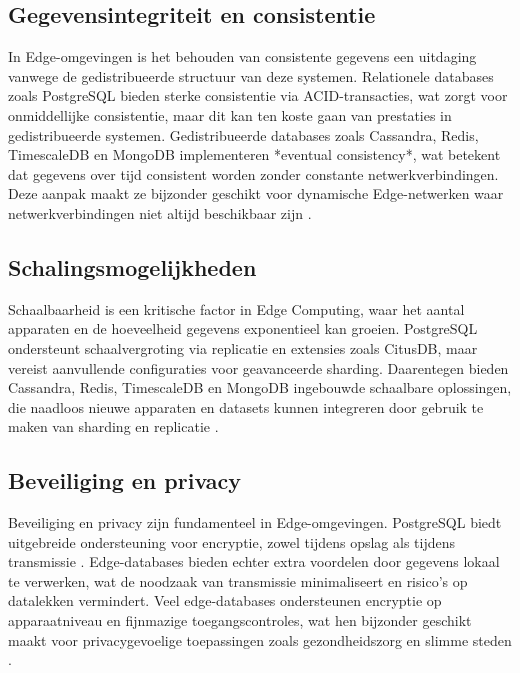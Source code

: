 \subsection{Gegevensintegriteit en consistentie}

In Edge-omgevingen is het behouden van consistente gegevens een uitdaging vanwege de gedistribueerde structuur van deze systemen. Relationele databases zoals PostgreSQL bieden sterke consistentie via ACID-transacties, wat zorgt voor onmiddellijke consistentie, maar dit kan ten koste gaan van prestaties in gedistribueerde systemen. Gedistribueerde databases zoals Cassandra, Redis, TimescaleDB en MongoDB implementeren *eventual consistency*, wat betekent dat gegevens over tijd consistent worden zonder constante netwerkverbindingen. Deze aanpak maakt ze bijzonder geschikt voor dynamische Edge-netwerken waar netwerkverbindingen niet altijd beschikbaar zijn \autocite{Taheri2020, Kleppmann2017, CassandraDocumentation}.

\subsection{Schalingsmogelijkheden}

Schaalbaarheid is een kritische factor in Edge Computing, waar het aantal apparaten en de hoeveelheid gegevens exponentieel kan groeien. PostgreSQL ondersteunt schaalvergroting via replicatie en extensies zoals CitusDB, maar vereist aanvullende configuraties voor geavanceerde sharding. Daarentegen bieden Cassandra, Redis, TimescaleDB en MongoDB ingebouwde schaalbare oplossingen, die naadloos nieuwe apparaten en datasets kunnen integreren door gebruik te maken van sharding en replicatie \autocite{CassandraDocumentation, RedisDocumentation, TimescaleDBDocumentation, MongoDBDocumentation}.

\subsection{Beveiliging en privacy}

Beveiliging en privacy zijn fundamenteel in Edge-omgevingen. PostgreSQL biedt uitgebreide ondersteuning voor encryptie, zowel tijdens opslag als tijdens transmissie \autocite{Kleppmann2017}. Edge-databases bieden echter extra voordelen door gegevens lokaal te verwerken, wat de noodzaak van transmissie minimaliseert en risico’s op datalekken vermindert. Veel edge-databases ondersteunen encryptie op apparaatniveau en fijnmazige toegangscontroles, wat hen bijzonder geschikt maakt voor privacygevoelige toepassingen zoals gezondheidszorg en slimme steden \autocite{Taheri2020}.

